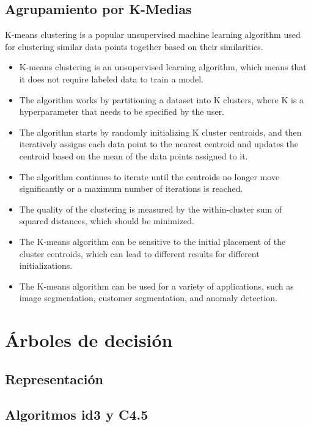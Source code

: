 \documentclass[12pt,a4paper, brazil]{article}
\begin{document}
    \subsection{Agrupamiento por K-Medias}
    K-means clustering is a popular unsupervised machine learning algorithm used for clustering similar data points together based on their similarities.
    \begin{itemize}
  \item K-means clustering is an unsupervised learning algorithm, which means that it does not require labeled data to train a model.
  
  \item The algorithm works by partitioning a dataset into K clusters, where K is a hyperparameter that needs to be specified by the user.
  
  \item The algorithm starts by randomly initializing K cluster centroids, and then iteratively assigns each data point to the nearest centroid and updates the centroid based on the mean of the data points assigned to it.
  
  \item The algorithm continues to iterate until the centroids no longer move significantly or a maximum number of iterations is reached.
  
  \item The quality of the clustering is measured by the within-cluster sum of squared distances, which should be minimized.
  
  \item The K-means algorithm can be sensitive to the initial placement of the cluster centroids, which can lead to different results for different initializations.
  
  \item The K-means algorithm can be used for a variety of applications, such as image segmentation, customer segmentation, and anomaly detection.
\end{itemize}
    
\section{Árboles de decisión}
    \subsection{Representación}
    \subsection{Algoritmos id3 y C4.5}
\end{document}
